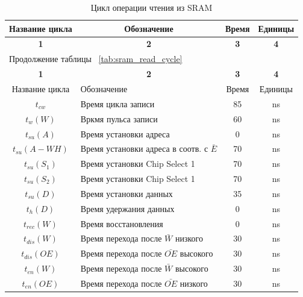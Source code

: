 \begin{center}
\begin{longtable}{|c|p{7cm}|c|c|}
\caption{Цикл операции чтения из SRAM} \label{tab:sram_write_cycle} \\ \hline
\multicolumn{1}{|p{3cm}|}{\textbf{Название цикла}}    &   \multicolumn{1}{c|}{\textbf{Обозначение}} & 
\multicolumn{1}{|c|}{\textbf{Время}}    &   \multicolumn{1}{c|}{\textbf{Единицы}} \\ \hline

\multicolumn{1}{|c|}{\textbf{1}}    &   \multicolumn{1}{|c|}{\textbf{2}} &
\multicolumn{1}{|c|}{\textbf{3}}    &   \multicolumn{1}{|c|}{\textbf{4}} \\ \hline
\endfirsthead

\multicolumn{2}{|l|}{{Продолжение таблицы ~\ref{tab:sram_read_cycle}}} \\ %
\hline
\multicolumn{1}{|c|}{\textbf{1}}    &   \multicolumn{1}{|c|}{\textbf{2}} &
\multicolumn{1}{|c|}{\textbf{3}}    &   \multicolumn{1}{|c|}{\textbf{4}} \\ \hline
\endhead
\endfoot

	\hline
		Название цикла & Обозначение & Время & Единицы \\
	\hline
		${t_{cw}}$ & Время цикла записи & 85 & ns \\
	\hline
		${t_w(W)}$ & Вркмя пульса записи & 60 & ns \\
	\hline
		${t_{su}(A)}$ & Время установки адреса & 0 & ns \\
	\hline
		${t_{su}(A-WH)}$ & Время установки адреса в соотв. с $\bar{E}$ & 70 & ns \\
	\hline
		${t_{su}(S_1)}$ & Время установки Chip Select 1 & 70 & ns \\
	\hline
		${t_{su}(S_2)}$ & Время установки Chip Select 1 & 70 & ns \\
	\hline
		${t_{su}(D)}$ & Время установки данных & 35 & ns \\
	\hline
		${t_{h}(D)}$ & Время удержания данных & 0 & ns \\
	\hline
		${t_{rec}(W)}$ & Время восстановления & 0 & ns \\
	\hline
		${t_{dis}(W)}$ & Время перехода после $\bar{W}$ низкого & 30 & ns \\
	\hline
		${t_{dis}(OE)}$ & Время перехода после $\bar{OE}$ высокого & 30 & ns \\
	\hline
		${t_{en}(W)}$ & Время перехода после $\bar{W}$ высокого & 30 & ns \\
	\hline
		${t_{en}(OE)}$ & Время перехода после $\bar{OE}$ низкого & 30 & ns \\
	\hline
\end{longtable}
\end{center}

